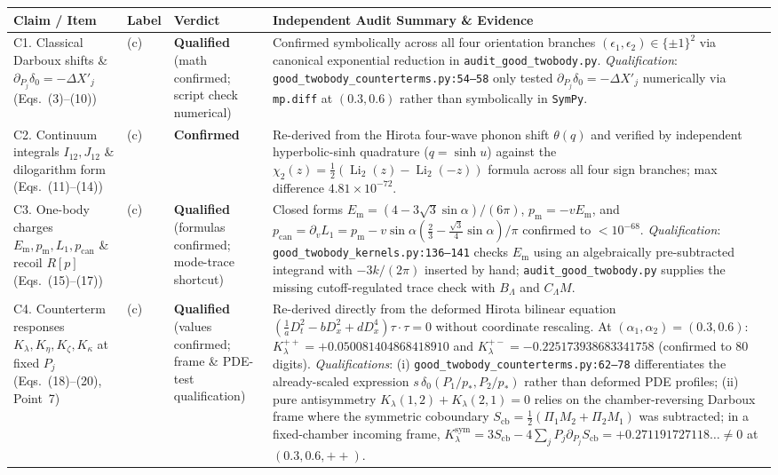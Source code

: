 \documentclass[11pt,a4paper]{article}
\begin{document}
\begin{center}
\footnotesize
\renewcommand{\arraystretch}{1.22}
\begin{longtable}{@{}p{2.9cm}p{0.8cm}p{1.9cm}p{9.9cm}@{}}
\toprule
\textbf{Claim / Item} & \textbf{Label} & \textbf{Verdict} & \textbf{Independent Audit Summary \& Evidence} \\
\midrule
\endhead
C1. Classical Darboux shifts \& $\partial_{P_j}\delta_0 = -\Delta X'_j$ (Eqs.~(3)--(10)) & (c) & \textbf{Qualified} (math confirmed; script check numerical) & Confirmed symbolically across all four orientation branches $(\epsilon_1,\epsilon_2)\in\{\pm 1\}^2$ via canonical exponential reduction in \texttt{audit\_good\_twobody.py}. \emph{Qualification}: \texttt{good\_twobody\_counterterms.py:54--58} only tested $\partial_{P_j}\delta_0 = -\Delta X'_j$ numerically via \texttt{mp.diff} at $(0.3,0.6)$ rather than symbolically in \texttt{SymPy}. \\
\addlinespace
C2. Continuum integrals $I_{12}, J_{12}$ \& dilogarithm form (Eqs.~(11)--(14)) & (c) & \textbf{Confirmed} & Re-derived from the Hirota four-wave phonon shift $\theta(q)$ and verified by independent hyperbolic-sinh quadrature ($q=\sinh u$) against the $\chi_2(z)=\tfrac{1}{2}(\operatorname{Li}_2(z)-\operatorname{Li}_2(-z))$ formula across all four sign branches; max difference $4.81\times 10^{-72}$. \\
\addlinespace
C3. One-body charges $E_{\mathrm{m}}, p_{\mathrm{m}}, L_1, p_{\mathrm{can}}$ \& recoil $R[p]$ (Eqs.~(15)--(17)) & (c) & \textbf{Qualified} (formulas confirmed; mode-trace shortcut) & Closed forms $E_{\mathrm{m}} = (4-3\sqrt{3}\sin\alpha)/(6\pi)$, $p_{\mathrm{m}}=-vE_{\mathrm{m}}$, and $p_{\mathrm{can}}=\partial_v L_1 = p_{\mathrm{m}} - v\sin\alpha(\tfrac{2}{3}-\tfrac{\sqrt{3}}{4}\sin\alpha)/\pi$ confirmed to $<10^{-68}$. \emph{Qualification}: \texttt{good\_twobody\_kernels.py:136--141} checks $E_{\mathrm{m}}$ using an algebraically pre-subtracted integrand with $-3k/(2\pi)$ inserted by hand; \texttt{audit\_good\_twobody.py} supplies the missing cutoff-regulated trace check with $B_\Lambda$ and $C_\Lambda M$. \\
\addlinespace
C4. Counterterm responses $K_\lambda, K_\eta, K_\zeta, K_\kappa$ at fixed $P_j$ (Eqs.~(18)--(20), Point~7) & (c) & \textbf{Qualified} (values confirmed; frame \& PDE-test qualification) & Re-derived directly from the deformed Hirota bilinear equation $(\tfrac{1}{a}D_t^2 - bD_x^2 + dD_x^4)\tau\cdot\tau=0$ without coordinate rescaling. At $(\alpha_1,\alpha_2)=(0.3,0.6)$: $K_\lambda^{++} = +0.050081404868418910$ and $K_\lambda^{+-} = -0.225173938683341758$ (confirmed to 80 digits). \emph{Qualifications}: (i) \texttt{good\_twobody\_counterterms.py:62--78} differentiates the already-scaled expression $s\,\delta_0(P_1/p_*,P_2/p_*)$ rather than deformed PDE profiles; (ii) pure antisymmetry $K_\lambda(1,2)+K_\lambda(2,1)=0$ relies on the chamber-reversing Darboux frame where the symmetric coboundary $S_{\mathrm{cb}}=\tfrac{1}{2}(\Pi_1 M_2 + \Pi_2 M_1)$ was subtracted; in a fixed-chamber incoming frame, $K_\lambda^{\mathrm{sym}} = 3S_{\mathrm{cb}} - 4\sum_j P_j\partial_{P_j}S_{\mathrm{cb}} = +0.271191727118\dots \neq 0$ at $(0.3,0.6,++)$. \\

\end{longtable}
\end{center}
\end{document}
